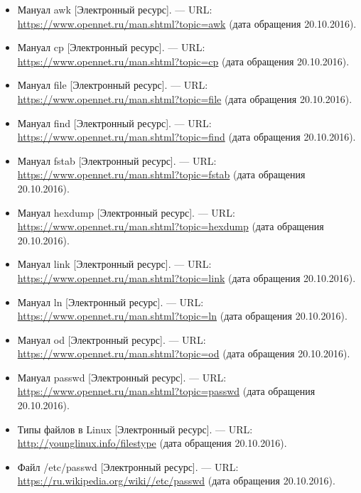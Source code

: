 \documentclass[14pt,a4paper,report]{report}
\begin{document}
\begin{itemize}
	\item Мануал awk [Электронный ресурс]. — URL: \href{https://www.opennet.ru/man.shtml?topic=awk}{https://www.opennet.ru/man.shtml?topic=awk} (дата обращения 20.10.2016).
	\item Мануал cp [Электронный ресурс]. — URL: \href{https://www.opennet.ru/man.shtml?topic=cp}{https://www.opennet.ru/man.shtml?topic=cp} (дата обращения 20.10.2016).
	\item Мануал file [Электронный ресурс]. — URL: \href{https://www.opennet.ru/man.shtml?topic=file}{https://www.opennet.ru/man.shtml?topic=file} (дата обращения 20.10.2016).
	\item Мануал find [Электронный ресурс]. — URL: \href{https://www.opennet.ru/man.shtml?topic=find}{https://www.opennet.ru/man.shtml?topic=find} (дата обращения 20.10.2016).
	\item Мануал fstab [Электронный ресурс]. — URL: \href{https://www.opennet.ru/man.shtml?topic=fstab1}{https://www.opennet.ru/man.shtml?topic=fstab} (дата обращения 20.10.2016).
	\item Мануал hexdump [Электронный ресурс]. — URL: \href{https://www.opennet.ru/man.shtml?topic=hexdump}{https://www.opennet.ru/man.shtml?topic=hexdump} (дата обращения 20.10.2016).
	\item Мануал link [Электронный ресурс]. — URL: \href{https://www.opennet.ru/man.shtml?topic=link}{https://www.opennet.ru/man.shtml?topic=link} (дата обращения 20.10.2016).
	\item Мануал ln [Электронный ресурс]. — URL: \href{https://www.opennet.ru/man.shtml?topic=ln}{https://www.opennet.ru/man.shtml?topic=ln} (дата обращения 20.10.2016).
	\item Мануал od [Электронный ресурс]. — URL: \href{https://www.opennet.ru/man.shtml?topic=od}{https://www.opennet.ru/man.shtml?topic=od} (дата обращения 20.10.2016).
	\item Мануал passwd [Электронный ресурс]. — URL: \href{https://www.opennet.ru/man.shtml?topic=passwd}{https://www.opennet.ru/man.shtml?topic=passwd} (дата обращения 20.10.2016).
	\item Типы файлов в Linux [Электронный ресурс]. — URL: \href{http://younglinux.info/filestype} {http://younglinux.info/filestype} (дата обращения 20.10.2016).
	\item Файл /etc/passwd [Электронный ресурс]. — URL: \href{https://ru.wikipedia.org/wiki//etc/passwd} {https://ru.wikipedia.org/wiki//etc/passwd} (дата обращения 20.10.2016).
\end{itemize}
\end{document}
